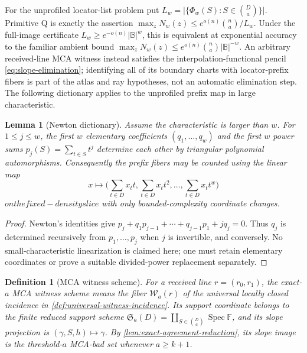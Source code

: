 \documentclass[12pt,a4paper]{amsart}
\numberwithin{equation}{section}
\newtheorem{lemma}[lemma]{Lemma}
\newtheorem{definition}[definition]{Definition}
\theoremstyle{remark}
\DeclareMathOperator{\Spec}{Spec}
\newcommand{\F}{\mathbb F}
\newcommand{\B}{\mathbb B}
\newcommand{\Wcal}{\mathcal W}
\newcommand{\abs}[1]{\lvert #1\rvert}
\begin{document}
For the unprofiled locator-list problem put
\(L_w=\abs{\{\Phi_w(S):S\in\binom Da\}}\).  Primitive Q is exactly the
assertion
\(\max_zN_w(z)\le e^{o(n)}\binom na/L_w\).  Under the full-image
certificate \(L_w\ge e^{-o(n)}\abs\B^w\), this is equivalent at
exponential accuracy to the familiar ambient bound
\(\max_zN_w(z)\le e^{o(n)}\binom na\abs\B^{-w}\).  An arbitrary
received-line MCA witness instead satisfies the interpolation-functional
pencil \eqref{eq:slope-elimination}; identifying all of its boundary charts
with locator-prefix fibers is part of the atlas and ray hypotheses, not an
automatic elimination step.  The following dictionary applies to the
unprofiled prefix map in large characteristic.

\begin{lemma}[Newton dictionary]\label{lem:newton-dictionary-expanded}
Assume the characteristic is larger than \(w\).  For \(1\le j\le w\),
the first \(w\) elementary coefficients \((q_1,\ldots,q_w)\) and the first
\(w\) power sums \(p_j(S)=\sum_{t\in S}t^j\) determine each other by
triangular polynomial automorphisms.  Consequently the prefix fibers may
be counted using the linear map
\[
        x\longmapsto \biggl(\sum_{t\in D}x_t t,
        \sum_{t\in D}x_t t^2,
        \ldots,
        \sum_{t\in D}x_t t^w\biggr)
\]
\(on the fixed-density slice\) with only bounded-complexity coordinate changes.
\end{lemma}

\begin{proof}
Newton's identities give \(p_j+q_1p_{j-1}+\cdots+q_{j-1}p_1+jq_j=0\).
Thus \(q_j\) is determined recursively from \(p_1,\ldots,p_j\) when
\(j\) is invertible, and conversely.  No small-characteristic
linearization is claimed here; one must retain elementary coordinates or
prove a suitable divided-power replacement separately.
\end{proof}

\begin{definition}[MCA witness scheme]\label{def:mca-witness-scheme}
For a received line \(r=(r_0,r_1)\), the exact-\(a\) MCA witness scheme
means the fiber \(\Wcal_a(r)\) of the universal locally closed incidence
in \cref{def:universal-witness-incidence}.  Its support coordinate belongs
to the finite reduced support scheme
\(\mathfrak S_a(D)=\coprod_{S\in\binom Da}\Spec\F\), and its slope
projection is \((\gamma,S,h)\mapsto\gamma\).  By
\cref{lem:exact-agreement-reduction}, its slope image is the
threshold-\(a\) MCA-bad set whenever \(a\ge k+1\).
\end{definition}
\end{document}
